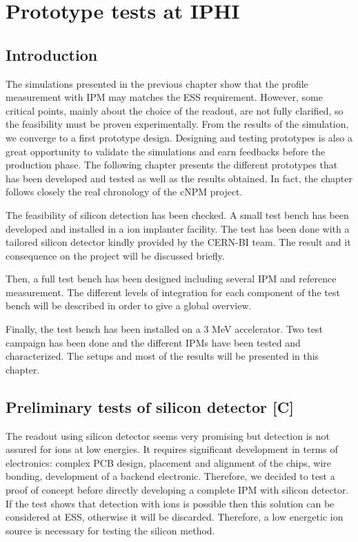 \chapter{Prototype tests at IPHI}
\cleardoublepage

\minitoc

\section{Introduction}
\begin{refsection}
  \label{ch4:Introduction [C]}
  The simulations presented in the previous chapter show that the profile measurement with IPM may matches the ESS requirement. However, some critical points, mainly about the choice of the readout, are not fully clarified, so the feasibility must be proven experimentally. From the results of the simulation, we converge to a first prototype design. Designing and testing prototypes is also a great opportunity to validate the simulations and earn feedbacks before the production phase. The following chapter presents the different prototypes that has been developed and tested as well as the results obtained. In fact, the chapter follows closely the real chronology of the cNPM project.

  The feasibility of silicon detection has been checked. A small test bench has been developed and installed in a ion implanter facility. The test has been done with a tailored silicon detector kindly provided by the CERN-BI team. The result and it consequence on the project will be discussed briefly.

  Then, a full test bench has been designed including several IPM and reference measurement. The different levels of integration for each component of the test bench will be described in order to give a global overview.

  Finally, the test bench has been installed on a 3 MeV accelerator. Two test campaign has been done and the different IPMs have been tested and characterized. The setups and most of the results will be presented in this chapter.

  \section{Preliminary tests of silicon detector [C]}
  The readout using silicon detector seems very promising but detection is not assured for ions at low energies. It requires significant development in terms of electronics: complex PCB design, placement and alignment of the chips, wire bonding, development of a backend electronic. Therefore, we decided to test a proof of concept before directly developing a complete IPM with silicon detector. If the test shows that detection with ions is possible then this solution can be considered at ESS, otherwise it will be discarded. Therefore, a low energetic ion source is necessary for testing the silicon method.


\end{refsection}
